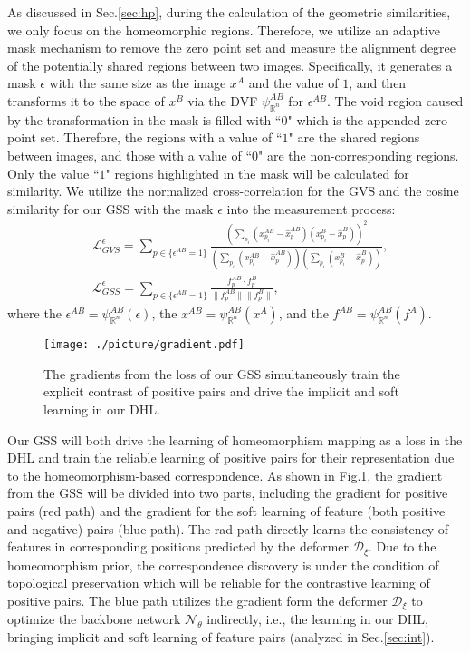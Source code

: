 As discussed in Sec.\ref{sec:hp}, during the calculation of the geometric similarities, we only focus on the homeomorphic regions. Therefore, we utilize an adaptive mask mechanism to remove the zero point set and measure the alignment degree of the potentially shared regions between two images. Specifically, it generates a mask $\epsilon$ with the same size as the image $x^{A}$ and the value of $1$, and then transforms it to the space of $x^{B}$ via the DVF $\psi^{AB}_{\mathbb{R}^{n}}$ for $\epsilon^{AB}$. The void region caused by the transformation in the mask is filled with ``$0$" which is the appended zero point set. Therefore, the regions with a value of ``$1$" are the shared regions between images, and those with a value of ``$0$" are the non-corresponding regions. Only the value ``$1$" regions highlighted in the mask will be calculated for similarity. We utilize the normalized cross-correlation \cite{he2021few} for the GVS and the cosine similarity for our GSS with the mask $\epsilon$ into the measurement process:
\begin{align}\label{equ:GSSGVS}
  &\mathcal{L}^{\epsilon}_{GVS}=\sum_{p\in\{\epsilon^{AB}=1\}}\frac{(\sum_{p_{i}}(x^{AB}_{p_{i}}-\hat{x}^{AB}_{p})(x^{B}_{p_{i}}-\hat{x}^{B}_{p}))^{2}}{(\sum_{p_{i}}(x^{AB}_{p_{i}}-\hat{x}^{AB}_{p}))(\sum_{p_{i}}(x^{B}_{p_{i}}-\hat{x}^{B}_{p}))}, \\
  &\mathcal{L}^{\epsilon}_{GSS}=\sum_{p\in\{\epsilon^{AB}=1\}}\frac{f^{AB}_{p}\cdot f^{B}_{p}}{\|f^{AB}_{p}\|\|f^{B}_{p}\|},
\end{align}
where the $\epsilon^{AB}=\psi^{AB}_{\mathbb{R}^{n}}(\epsilon)$, the $x^{AB}=\psi^{AB}_{\mathbb{R}^{n}}(x^{A})$, and the $f^{AB}=\psi^{AB}_{\mathbb{R}^{n}}(f^{A})$.
\begin{figure}
  \centering
  \texttt{[image: ./picture/gradient.pdf]}
  \caption{The gradients from the loss of our GSS simultaneously train the explicit contrast of positive pairs and drive the implicit and soft learning in our DHL.}
  \label{method:grad}
\end{figure}

Our GSS will both drive the learning of homeomorphism mapping as a loss in the DHL and train the reliable learning of positive pairs for their representation due to the homeomorphism-based correspondence. As shown in Fig.\ref{method:grad}, the gradient from the GSS will be divided into two parts, including the gradient for positive pairs (red path) and the gradient for the soft learning of feature (both positive and negative) pairs (blue path). The rad path directly learns the consistency of features in corresponding positions predicted by the deformer $\mathcal{D}_{\xi}$. Due to the homeomorphism prior, the correspondence discovery is under the condition of topological preservation which will be reliable for the contrastive learning of positive pairs. The blue path utilizes the gradient form the deformer $\mathcal{D}_{\xi}$ to optimize the backbone network $\mathcal{N}_{\theta}$ indirectly, i.e., the learning in our DHL, bringing implicit and soft learning of feature pairs (analyzed in Sec.\ref{sec:int}).

